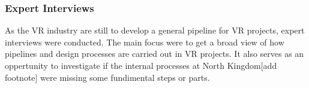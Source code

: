 \subsubsection{Expert Interviews}
As the VR industry are still to develop a general pipeline for VR projects, expert interviews were conducted. The main focus were to get a broad view of how pipelines and design processes are carried out in VR projects. It also serves as an oppertunity to investigate if the internal processes at North Kingdom[add footnote] were missing some fundimental steps or parts. 
